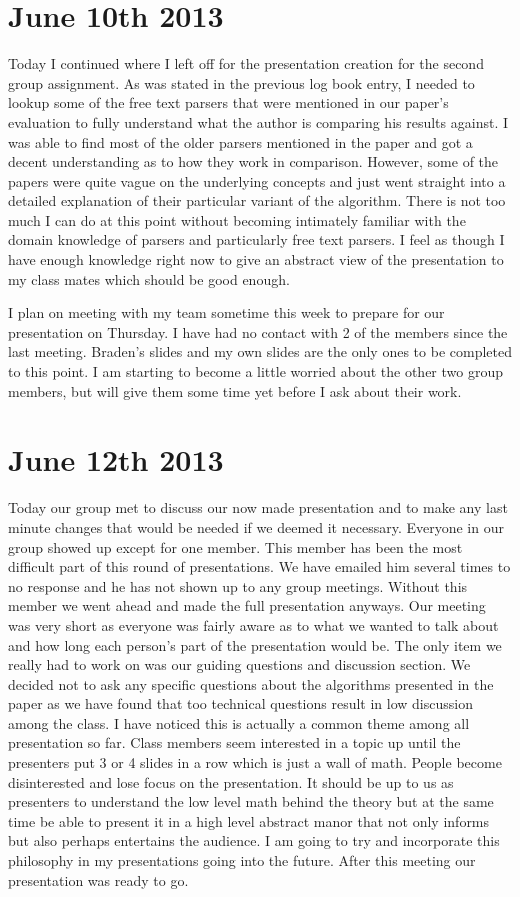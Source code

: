 \documentclass[conference]{IEEEtran}
\begin{document}
\section{June 10th 2013}
Today I continued where I left off for the presentation creation for the second group assignment.
As was stated in the previous log book entry, I needed to lookup some of the free text parsers
that were mentioned in our paper's evaluation to fully understand what the author is comparing 
his results against. I was able to find most of the older parsers mentioned in the paper and
got a decent understanding as to how they work in comparison. However, some of the papers were 
quite vague on the underlying concepts and just went straight into a detailed explanation of their
particular variant of the algorithm. There is not too much I can do at this point without becoming
intimately familiar with the domain knowledge of parsers and particularly free text parsers. I feel
as though I have enough knowledge right now to give an abstract view of the presentation to my class
mates which should be good enough.

I plan on meeting with my team sometime this week to prepare for our presentation on Thursday. I
have had no contact with 2 of the members since the last meeting. Braden's slides and my own slides
are the only ones to be completed to this point. I am starting to become a little worried about the
other two group members, but will give them some time yet before I ask about their work.

\section{June 12th 2013}
Today our group met to discuss our now made presentation and to make any last minute changes that
would be needed if we deemed it necessary. Everyone in our group showed up except for one member. This
member has been the most difficult part of this round of presentations. We have emailed him several
times to no response and he has not shown up to any group meetings. Without this member we went ahead
and made the full presentation anyways. Our meeting was very short as everyone was fairly aware as to
what we wanted to talk about and how long each person's part of the presentation would be. The only
item we really had to work on was our guiding questions and discussion section. We decided not to
ask any specific questions about the algorithms presented in the paper as we have found that too technical
questions result in low discussion among the class. I have noticed this is actually a common theme
among all presentation so far. Class members seem interested in a topic up until the presenters 
put 3 or 4 slides in a row which is just a wall of math. People become disinterested and lose focus
on the presentation. It should be up to us as presenters to understand the low level math behind the
theory but at the same time be able to present it in a high level abstract manor that not only informs
but also perhaps entertains the audience. I am going to try and incorporate this philosophy in my
presentations going into the future. After this meeting our presentation was ready to go.
\end{document}
